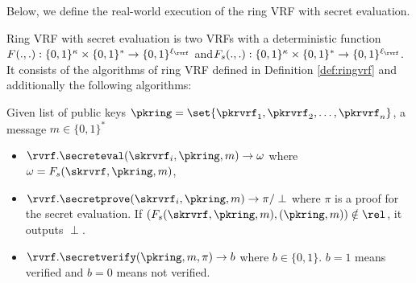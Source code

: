 Below, we define the real-world execution of the ring VRF with secret evaluation.
\begin{definition}\label{def:ringvrfse}
	Ring VRF with secret evaluation is two VRFs with a deterministic function $ F(.,.):\{0,1\}^\kappa \times\{0,1\}^* \rightarrow \{0,1\}^{\ell_\rvrf} $ and$ F_s(.,.):\{0,1\}^\kappa \times\{0,1\}^* \rightarrow \{0,1\}^{\ell_\rvrf} $. It consists of the algorithms of ring VRF defined in Definition \ref{def:ringvrf} and additionally the following algorithms:
	
	Given list of public keys $ \pkring = \set{\pkrvrf_1, \pkrvrf_2, \ldots, \pkrvrf_n}$, a message $ m \in \{0,1\}^* $
	\begin{itemize}
		\item $ \rvrf.\secreteval(\skrvrf_i, \pkring, m)\rightarrow \omega $ where $ \omega = F_s(\skrvrf,\pkring,m) $,
		\item $ \rvrf.\secretprove(\skrvrf_i, \pkring, m)\rightarrow \pi / \perp $ where  $ \pi $ is a proof for the secret evaluation. If $ (F_s(\skrvrf,\pkring,m), (\pkring, m)) \notin \rel  $, it outputs $ \perp $.
		\item $ \rvrf.\secretverify(\pkring, m,\pi) \rightarrow  b$ where $ b \in \{0,1\} $. $ b =1 $ means verified and $ b = 0 $ means not verified.
	\end{itemize}
	
\end{definition}

